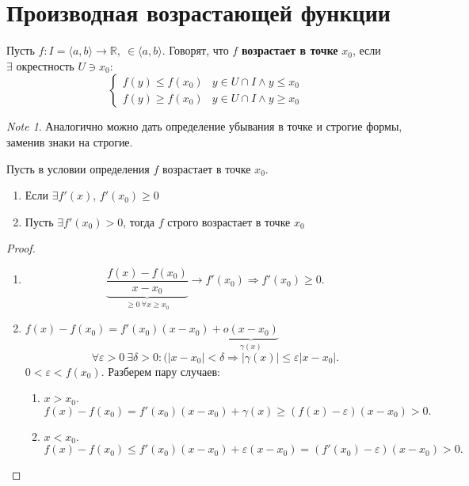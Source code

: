 \documentclass[11pt]{book}
\newcommand{\R}{\mathbb{R}}
\renewcommand{\le}{\leqslant}
\renewcommand{\ge}{\geqslant}
\theoremstyle{definition}
\theoremstyle{plain}
\theoremstyle{plain}
\theoremstyle{definition}
\theoremstyle{remark}
\newtheorem*{note}{Note}
\begin{document}
\section{Производная возрастающей функции}
\begin{defn}
    Пусть $ f: I = \langle a, b \rangle \to  \R, ~ \in \langle a, b \rangle $.
    Говорят, что $ f$ {\bf возрастает в точке} $ x_0$, если $ \exists \text{ окрестность }U\ni x_0$:
    $$
    \begin{cases}
	f(y) \le f(x_0) & y \in U\cap I \wedge  y \le x_0 \\
	f(y) \ge f(x_0) & y \in U\cap I \wedge  y \ge x_0
    \end{cases}
    $$
\end{defn}
\begin{note}
    Аналогично можно дать определение убывания в точке и строгие формы, заменив знаки на строгие.
\end{note}
\begin{thm}
    Пусть в условии определения $ f$ возрастает в точке $ x_0$.
    \begin{enumerate}
	\item Если $ \exists f'(x)$, $ f'(x_0) \ge 0$
	\item Пусть $ \exists f'(x_0) >0$, тогда $ f$ строго возрастает в точке $ x_0$
    \end{enumerate}
\end{thm}
\begin{proof}
    $ $
    \begin{enumerate}
	\item \[
		\underbrace{\frac{f(x)-f(x_0)}{x-x_0}}_{ \ge 0 ~\forall x \ge x_0 } \to f'(x_0) \Longrightarrow f'(x_0) \ge 0
	    .\]
	\item $ f(x) -f(x_0) = f'(x_0) (x-x_0) + \underbrace{o(x-x_0)}_{\gamma(x)}$
	    \[
	    \forall \varepsilon >0 ~ \exists \delta >0: \bigl(|x -x_0| < \delta \Longrightarrow |\gamma(x)| \le \varepsilon |x-x_0|
	    .\]
	    $ 0 < \varepsilon < f(x_0)$.
	    Разберем пару случаев:
	    \begin{enumerate}
		\item $ x>x_0$.
		    \[
			f(x) - f(x_0) = f'(x_0)(x-x_0) + \gamma(x) \ge (f(x) - \varepsilon )(x-x_0) >0
		    .\]
		\item $ x < x_0$.
		    \[
			f(x) -f(x_0) \le f'(x_0)(x-x_0) + \varepsilon (x-x_0) = (f'(x_0) - \varepsilon )(x-x_0) > 0
		    .\]
	    \end{enumerate}
    \end{enumerate}
\end{proof}
\end{document}
